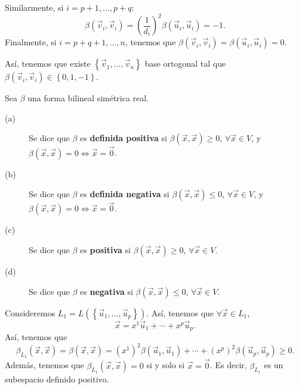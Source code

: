 Similarmente, si $\displaystyle i = p + 1, \ldots, p + q $:
\[ \beta\left(\vec{v}_{i}, \vec{v}_{i}\right) = \left(\frac{1}{d _{i}}\right)^{2}\beta\left(\vec{u}_{i}, \vec{u}_{i}\right) = -1 .\]
Finalmente, si $\displaystyle i = p + q + 1, \ldots, n $, tenemos que $\displaystyle \beta\left(\vec{v}_{i}, \vec{v}_{i}\right) = \beta\left(\vec{u}_{i}, \vec{u}_{i}\right) = 0 $.
\begin{observation}
	\normalfont Así, tenemos que existe $\displaystyle \left\{ \vec{v}_{1}, \ldots, \vec{v}_{n}\right\}  $ base ortogonal tal que $\displaystyle \beta\left(\vec{v}_{i}, \vec{v}_{i}\right) \in \left\{ 0, 1, - 1\right\}  $.
\end{observation}
\begin{fdefinition}[]
\normalfont Sea $\displaystyle \beta  $ una forma bilineal simétrica real.
\begin{description}
\item[(a)] Se dice que $\displaystyle \beta  $ es \textbf{definida positiva} si $\displaystyle \beta\left(\vec{x}, \vec{x}\right) \geq 0 $, $\displaystyle \forall \vec{x} \in V $, y $\displaystyle \beta\left(\vec{x}, \vec{x}\right) = 0 \iff \vec{x} = \vec{0} $.
\item[(b)] Se dice que $\displaystyle \beta  $ es \textbf{definida negativa} si $\displaystyle \beta\left(\vec{x}, \vec{x}\right) \leq 0 $, $\displaystyle \forall \vec{x} \in V $, y $\displaystyle \beta\left(\vec{x}, \vec{x}\right) = 0 \iff \vec{x} = \vec{0} $.
\item[(c)] Se dice que $\displaystyle \beta  $ es \textbf{positiva} si $\displaystyle \beta\left(\vec{x}, \vec{x}\right) \geq 0 $, $\displaystyle \forall \vec{x} \in V $.
\item[(d)] Se dice que $\displaystyle \beta  $ es \textbf{negativa} si $\displaystyle \beta\left(\vec{x}, \vec{x}\right) \leq 0 $, $\displaystyle \forall \vec{x} \in V $.
\end{description}
\end{fdefinition}
Consideremos $\displaystyle L_{1} = L\left( \left\{ \vec{u}_{1}, \ldots, \vec{u}_{p}\right\} \right) $. Así, tenemos que $\displaystyle \forall \vec{x} \in L_{1} $,
\[ \vec{x} = x^{1}\vec{u}_{1} + \cdots + x^{p}\vec{u}_{p} .\]
Así, tenemos que 
\[ \beta_{L_{1}}\left(\vec{x}, \vec{x}\right) = \beta\left(\vec{x}, \vec{x}\right) = \left(x^{1}\right)^{2}\beta\left(\vec{u}_{1},\vec{u}_{1}\right) + \cdots + \left(x^{p}\right)^{2}\beta\left(\vec{u}_{p}, \vec{u}_{p}\right) \geq 0 .\]
Además, tenemos que $\displaystyle \beta_{L_{1}}\left(\vec{x}, \vec{x}\right) = 0 $ si y solo si $\displaystyle \vec{x} = \vec{0} $. Es decir, $\displaystyle \beta_{L_{1}} $ es un subespacio definido positivo. 

